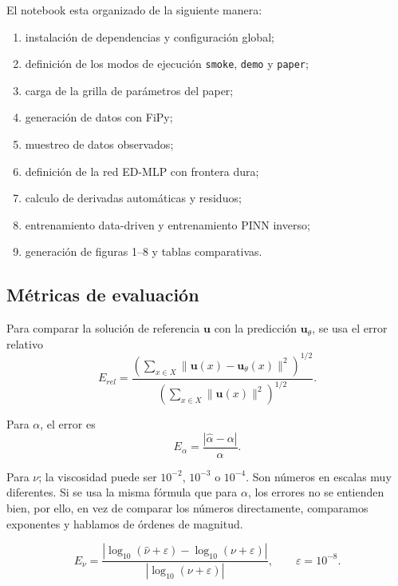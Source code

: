 \documentclass[10pt,letterpaper,twocolumn]{article}
\begin{document}
El notebook esta organizado de la siguiente manera:
\begin{enumerate}[leftmargin=*]
    \item instalación de dependencias y configuración global;
    \item definición de los modos de ejecución \texttt{smoke}, \texttt{demo} y \texttt{paper};
    \item carga de la grilla de parámetros del paper;
    \item generación de datos con FiPy;
    \item muestreo de datos observados;
    \item definición de la red ED-MLP con frontera dura;
    \item calculo de derivadas automáticas y residuos;
    \item entrenamiento data-driven y entrenamiento PINN inverso;
    \item generación de figuras 1--8 y tablas comparativas.
\end{enumerate}

\subsection{Métricas de evaluación}

Para comparar la solución de referencia $\mathbf{u}$ con la predicción $\mathbf{u}_\theta$, se usa el error relativo
\begin{equation}
    E_{rel}=\frac{\left(\sum_{x\in X}\|\mathbf{u}(x)-\mathbf{u}_\theta(x)\|^2\right)^{1/2}}{\left(\sum_{x\in X}\|\mathbf{u}(x)\|^2\right)^{1/2}}.
\end{equation}

Para $\alpha$, el error es
\begin{equation}
    E_\alpha=\frac{|\widehat{\alpha}-\alpha|}{\alpha}.
\end{equation}

Para $\nu$; la viscosidad puede ser \( 10^{-2} \), \( 10^{-3} \) o \( 10^{-4} \). Son números en escalas muy diferentes. Si se usa la misma fórmula que para \( \alpha \), los errores no se entienden bien, por ello, en vez de comparar los números directamente, comparamos exponentes y hablamos de órdenes de magnitud. 

\begin{equation}
    E_\nu=\frac{|\log_{10}(\widehat{\nu}+\varepsilon)-\log_{10}(\nu+\varepsilon)|}{|\log_{10}(\nu+\varepsilon)|},
    \qquad \varepsilon=10^{-8}.
\end{equation}
\end{document}
